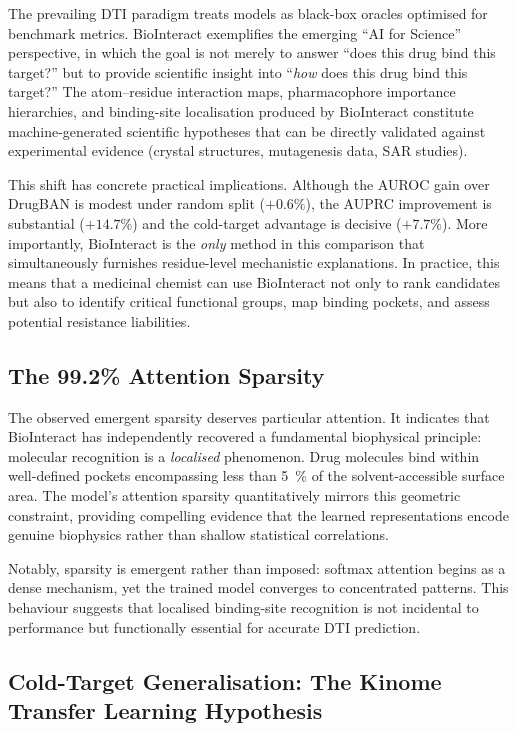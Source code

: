 \documentclass[fleqn,10pt]{wlscirep}
\begin{document}
The prevailing DTI paradigm treats models as black-box oracles optimised for
benchmark metrics.  BioInteract exemplifies the emerging ``AI for Science''
perspective, in which the goal is not merely to answer ``does this drug bind
this target?'' but to provide scientific insight into ``\emph{how} does this
drug bind this target?''  The atom--residue interaction maps, pharmacophore
importance hierarchies, and binding-site localisation produced by BioInteract
constitute machine-generated scientific hypotheses that can be directly validated
against experimental evidence (crystal structures, mutagenesis data, SAR
studies).

This shift has concrete practical implications.  Although the AUROC gain over
DrugBAN is modest under random split ($+0.6\%$), the AUPRC improvement is
substantial ($+14.7\%$) and the cold-target advantage is decisive ($+7.7\%$).
More importantly, BioInteract is the \emph{only} method in this comparison that
simultaneously furnishes residue-level mechanistic explanations.  In practice,
this means that a medicinal chemist can use BioInteract not only to rank
candidates but also to identify critical functional groups, map binding pockets,
and assess potential resistance liabilities.

\subsection{The 99.2\% Attention Sparsity}

The observed emergent sparsity deserves particular attention.  It indicates that
BioInteract has independently recovered a fundamental biophysical principle:
molecular recognition is a \emph{localised} phenomenon.  Drug molecules bind
within well-defined pockets encompassing less than \SI{5}{\percent} of the
solvent-accessible surface area.\cite{laskowski1995surfnet}  The model's
attention sparsity quantitatively mirrors this geometric constraint, providing
compelling evidence that the learned representations encode genuine biophysics
rather than shallow statistical correlations.

Notably, sparsity is emergent rather than imposed: softmax attention begins as a
dense mechanism, yet the trained model converges to concentrated patterns.  This
behaviour suggests that localised binding-site recognition is not incidental to
performance but functionally essential for accurate DTI prediction.

\subsection{Cold-Target Generalisation: The Kinome Transfer Learning Hypothesis}
\end{document}
